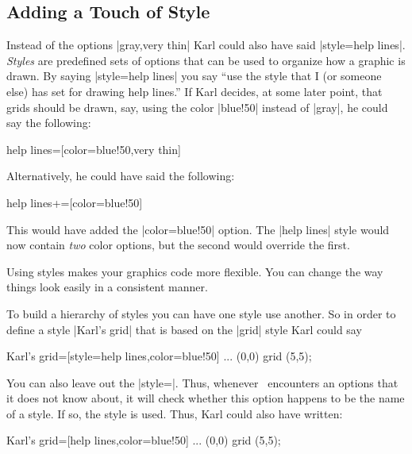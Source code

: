 \begin{codeexample}[]
\end{codeexample}


\subsection{Adding a Touch of  Style}

Instead of the options |gray,very thin| Karl could also have
said |style=help lines|. \emph{Styles} are predefined sets of options
that can be used to organize how a graphic is drawn. By saying
|style=help lines| you say ``use the style that I (or someone else)
has set for drawing help lines.'' If Karl decides, at some later
point, that grids should be drawn, say, using the color |blue!50|
instead of |gray|, he could say the following:
\begin{codeexample}
\tikzstyle help lines=[color=blue!50,very thin]
\end{codeexample}
Alternatively, he could have said the following:
\begin{codeexample}
\tikzstyle help lines+=[color=blue!50]
\end{codeexample}
This would have added the |color=blue!50| option. The |help lines|
style would now contain \emph{two} color options, but 
the second would override the first.

Using styles makes your graphics code more flexible. You can
change the way things look easily in a consistent manner.

To build a hierarchy of styles you can have one style use
another. So in order to define a style |Karl's grid| that is based on
the |grid| style Karl could say
\begin{codeexample}
\tikzstyle Karl's grid=[style=help lines,color=blue!50]
...
\draw[style=Karl's grid] (0,0) grid (5,5);
\end{codeexample}

You can also leave out the |style=|. Thus, whenever \tikzname\ encounters
an options that it does not know about, it will check whether this
option happens to be the name of a style. If so, the style is
used. Thus, Karl could also have written:
\begin{codeexample}
\tikzstyle Karl's grid=[help lines,color=blue!50]
...
 (0,0) grid (5,5);
\end{codeexample}

